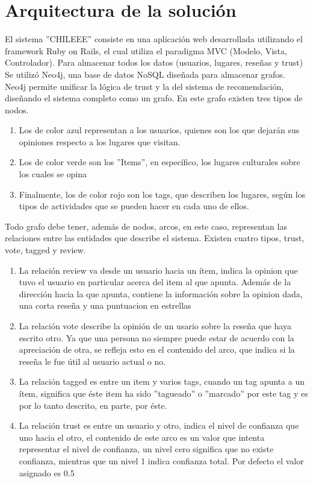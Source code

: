 \section{Arquitectura de la solución} 

El sistema ''CHILEEE'' consiste en una aplicación web desarrollada utilizando el framework Ruby on Rails, el cual utiliza el paradigma MVC (Modelo, Vista, Controlador). Para almacenar todos los datos (usuarios, lugares, reseñas y trust) Se utilizó Neo4j, una base de datos NoSQL diseñada para almacenar grafos. Neo4j permite unificar la lógica de trust y la del sistema de recomendación, diseñando el sistema completo como un grafo. En este grafo existen tres tipos de nodos.

\begin{enumerate}
\item{Los de color azul representan a los usuarios, quienes son los que dejarán sus opiniones respecto a los lugares que visitan.}
\item{Los de color verde son los ''Items'', en específico, los lugares culturales sobre los cuales se opina}
\item{Finalmente, los de color rojo son los tags, que describen los lugares, según los tipos de actividades que se pueden hacer en cada uno de ellos.}
\end{enumerate} 
Todo grafo debe tener, además de nodos, arcos, en este caso, representan las relaciones entre las entidades que describe el sistema. Existen cuatro tipos, trust, vote, tagged y review.
\begin{enumerate}
\item{La relación review va desde un usuario hacia un ítem, indica la opinion que tuvo el usuario en particular acerca del item al que apunta. Además de la dirección hacia la que apunta, contiene la información sobre la opinion dada, una corta reseña y una puntuacion en estrellas}
\item{La relación vote describe la opinión de un usario sobre la reseña que haya escrito otro. Ya que una persona no siempre puede estar de acuerdo con la apreciación de otra, se refleja esto en el contenido del arco, que indica si la reseña le fue útil al usuario actual o no.}
\item{La relación tagged es entre un item y varios tags, cuando un tag apunta a un ítem, significa que éste item ha sido ''tagueado'' o ''marcado'' por este tag y es por lo tanto descrito, en parte, por éste. }
\item{La relación trust es entre un usuario y otro, indica el nivel de confianza que uno hacia el otro, el contenido de este arco es un valor que intenta representar el nivel de confianza, un nivel cero significa que no existe confianza, mientras que un nivel 1 indica confianza total. Por defecto el valor asignado es 0.5}
\end{enumerate}

